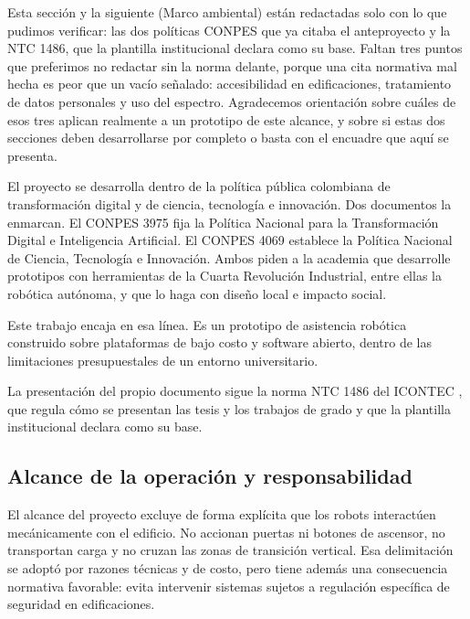 \begin{notarevisor}
Esta sección y la siguiente (Marco ambiental) están redactadas solo con lo que
pudimos verificar: las dos políticas CONPES que ya citaba el anteproyecto y la
NTC 1486, que la plantilla institucional declara como su base. Faltan tres
puntos que preferimos no redactar sin la norma delante, porque una cita
normativa mal hecha es peor que un vacío señalado: accesibilidad en
edificaciones, tratamiento de datos personales y uso del espectro. Agradecemos
orientación sobre cuáles de esos tres aplican realmente a un prototipo de este
alcance, y sobre si estas dos secciones deben desarrollarse por completo o basta
con el encuadre que aquí se presenta.
\end{notarevisor}

El proyecto se desarrolla dentro de la política pública colombiana de
transformación digital y de ciencia, tecnología e innovación. Dos documentos la
enmarcan. El CONPES 3975 \cite{conpes3975} fija la Política Nacional para la
Transformación Digital e Inteligencia Artificial. El CONPES 4069
\cite{conpes4069} establece la Política Nacional de Ciencia, Tecnología e
Innovación. Ambos piden a la academia que desarrolle prototipos con herramientas
de la Cuarta Revolución Industrial, entre ellas la robótica autónoma, y que lo
haga con diseño local e impacto social.

Este trabajo encaja en esa línea. Es un prototipo de asistencia robótica
construido sobre plataformas de bajo costo y software abierto, dentro de las
limitaciones presupuestales de un entorno universitario.

La presentación del propio documento sigue la norma NTC 1486 del ICONTEC
\cite{ntc1486}, que regula cómo se presentan las tesis y los trabajos de grado y
que la plantilla institucional declara como su base.

\subsection{Alcance de la operación y responsabilidad}

El alcance del proyecto excluye de forma explícita que los robots interactúen
mecánicamente con el edificio. No accionan puertas ni botones de ascensor, no
transportan carga y no cruzan las zonas de transición vertical. Esa delimitación
se adoptó por razones técnicas y de costo, pero tiene además una consecuencia
normativa favorable: evita intervenir sistemas sujetos a regulación específica de
seguridad en edificaciones.


